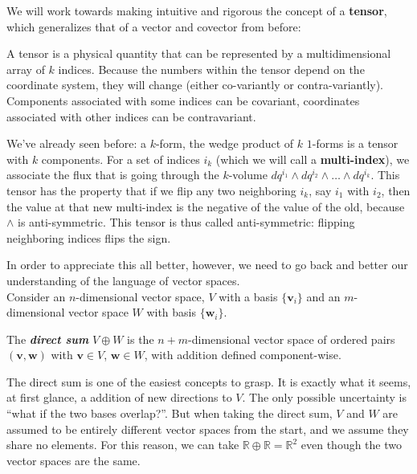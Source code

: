 \documentclass[../master.tex]{subfiles}
\begin{document}
	We will work towards making intuitive and rigorous the concept of a \textbf{tensor}, which generalizes that of a vector and covector from before:
	\begin{concept}[Tensor]
		A tensor is a physical quantity that can be represented by a multidimensional array of $k$ indices. Because the numbers within the tensor depend on the coordinate system, they will change (either co-variantly or contra-variantly). Components associated with some indices can be covariant, coordinates associated with other indices can be contravariant. 
	\end{concept}
	We've already seen before: a $k$-form, the wedge product of $k$ $1$-forms is a tensor with $k$ components. For a set of indices $i_k$ (which we will call a \textbf{multi-index}), we associate the flux that is going through the $k$-volume $dq^{i_1} \wedge dq^{i_2} \wedge \dots \wedge dq^{i_k}$. This tensor has the property that if we flip any two neighboring $i_k$, say $i_1$ with $i_2$, then the value at that new multi-index is the negative of the value of the old, because $\wedge$ is anti-symmetric. This tensor is thus called anti-symmetric: flipping neighboring indices flips the sign.
	
	In order to appreciate this all better, however, we need to go back and better our understanding of the language of vector spaces. \\
	
	Consider an $n$-dimensional vector space, $V$ with a basis $\{ \mathbf v_i \}$ and an $m$-dimensional vector space $W$ with basis $\{ \mathbf w_i \}$. 
	\begin{defn}
		The \emph{\textbf{direct sum}} $V \oplus W$ is the $n+m$-dimensional vector space of ordered pairs $(\mathbf v, \mathbf w)$ with $\mathbf v \in V$, $\mathbf w \in W$, with addition defined component-wise.
	\end{defn}
	
	
	The direct sum is one of the easiest concepts to grasp. It is exactly what it seems, at first glance, a addition of new directions to $V$. The only possible uncertainty is ``what if the two bases overlap?''. But when taking the direct sum, $V$ and $W$ are assumed to be entirely different vector spaces from the start, and we assume they share no elements. For this reason, we can take $\mathbb{R} \oplus \mathbb{R} = \mathbb{R}^2$ even though the two vector spaces are the same.
	
\end{document}
